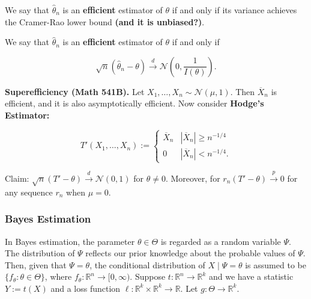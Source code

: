 \begin{definition}

We say that \(\hat{\theta}_n\) is an \textbf{efficient} estimator of \(\theta\) if and only if its variance achieves the Cramer-Rao lower bound \textbf{(and it is unbiased?)}. 

\end{definition}

\begin{definition}

We say that \(\hat{\theta}_n\) is an \textbf{efficient} estimator of \(\theta\) if and only if

\[
\sqrt{n}( \hat{\theta}_n - \theta) \xrightarrow{d} \mathcal{N} \left(0, \frac{1}{I(\theta)}\right).
\]

\end{definition}

\textbf{Superefficiency (Math 541B).} Let \(X_1, \ldots, X_n \sim \mathcal{N}(\mu, 1)\). Then \(\overline{X}_n\) is efficient, and it is also asymptotically efficient. Now consider \textbf{Hodge's Estimator:}

\[
T'(X_1, \ldots, X_n) := \begin{cases}
\overline{X}_n & | \overline{X}_n | \geq n^{-1/4} \\
0 & |\overline{X}_n | < n^{-1/4}.
\end{cases}
\]

Claim: \(\sqrt{n}(T' - \theta) \xrightarrow{d} \mathcal{N}(0,1)\) for \(\theta \neq 0\). Moreover, for \(r_n(T' - \theta) \xrightarrow{p} 0\) for any sequence \(r_n\) when \(\mu = 0\).

\subsubsection{Bayes Estimation}

In Bayes estimation, the parameter \(\theta \in \Theta\) is regarded as a random variable \(\Psi\). The distribution of \(\Psi\) reflects our prior knowledge about the probable values of \(\Psi\). Then, given that \(\Psi = \theta\), the conditional distribution of \(X \mid \Psi= \theta\) is assumed to be \(\{f_\theta: \theta \in \Theta \}\), where \(f_\theta: \mathbb{R}^n \to [0, \infty)\). Suppose \(t: \mathbb{R}^n \to \mathbb{R}^k\) and we have a statistic \(Y := t(X)\) and a loss function \(\ell: \mathbb{R}^k \times \mathbb{R}^k \to \mathbb{R}\). Let \(g: \Theta \to \mathbb{R}^k\).

